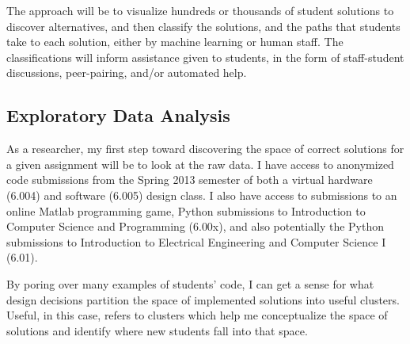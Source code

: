 \documentclass[12pt]{article}
\begin{document}
The approach will be to visualize hundreds or thousands of student solutions to discover alternatives, and then classify the solutions, and the paths that students take to each solution, either by machine learning or human staff. The classifications will inform assistance given to students, in the form of staff-student discussions, peer-pairing, and/or automated help.


\subsection{Exploratory Data Analysis}

As a researcher, my first step toward discovering the space of correct solutions for a given assignment will be to look at the raw data. I have access to anonymized code submissions from the Spring 2013 semester of both a virtual hardware (6.004) and software (6.005) design class. I also have access to submissions to an online Matlab programming game, Python submissions to Introduction to Computer Science and Programming (6.00x), and also potentially the Python submissions to Introduction to Electrical Engineering and Computer Science I (6.01). 

By poring over many examples of students' code, I can get a sense for what design decisions partition the space of implemented solutions into useful clusters. Useful, in this case, refers to clusters which help me conceptualize the space of solutions and identify where new students fall into that space. 

\end{document}
